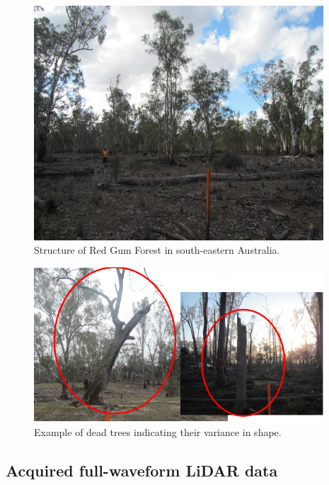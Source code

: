 \documentclass{subfiles}
\begin{document}
\begin{figure} [h!]
	\centering
	\includegraphics[width=0.965\textwidth]{img/dead/Eucalyptus.png}
	\caption{Structure of Red Gum Forest in south-eastern Australia.}
	\label{fig:EucalyptusSize}
\end{figure}

\begin{figure} [h!]
	\centering
	\includegraphics[width=0.965\textwidth]{img/dead/DeadTreesExamplePhotos}
	\caption{Example of dead trees indicating their variance in shape.}
	\label{fig:DeadTreesExamplePhotos}
\end{figure}

\subsection{Acquired full-waveform LiDAR data}\label{sec:AcquiredData}
\end{document}
